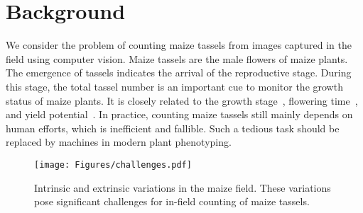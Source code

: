 \documentclass[twocolumn]{bmcart}%
\begin{document}
\begin{frontmatter}
\begin{fmbox}
\begin{abstractbox}
\begin{abstract}
\end{abstract}

%
%
%
%
%
%
%

\begin{keyword}
\end{keyword}

%
%
%
%
%
%

\end{abstractbox}
%
\end{fmbox}%

\end{frontmatter}

%
%
%
%
%
%
%
%
%
%
%
%
%
%
%
%
%
%
%

%
%

%
%
%
\section*{Background}
%
We consider the problem of counting maize tassels from images captured in the field using computer vision. Maize tassels are the male flowers of maize plants. The emergence of tassels indicates the arrival of the reproductive stage. During this stage, the total tassel number is an important cue to monitor the growth status of maize plants. It is closely related to the growth stage~\cite{ye2013image}, flowering time~\cite{guo2015automated}, and yield potential~\cite{lu2015fine}. In practice, counting maize tassels still mainly depends on human efforts, which is inefficient and fallible. Such a tedious task should be replaced by machines in modern plant phenotyping.

\begin{figure*}[h!]
	\centering
	\texttt{[image: Figures/challenges.pdf]}
	\caption{Intrinsic and extrinsic variations in the maize field. These variations pose significant challenges for in-field counting of maize tassels.}
	\label{fig:challenges}
\end{figure*}
\end{document}
